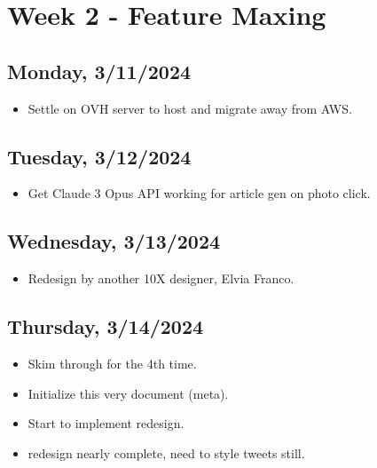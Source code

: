 \newpage
\section{Week 2 - Feature Maxing}

\subsection*{Monday, 3/11/2024}
\begin{itemize}
    \item Settle on OVH server to host and migrate away from AWS.
\end{itemize}

\subsection*{Tuesday, 3/12/2024}
\begin{itemize}
    \item Get Claude 3 Opus API working for article gen on photo click.
\end{itemize}

\subsection*{Wednesday, 3/13/2024}
\begin{itemize}
    \item Redesign by another 10X designer, Elvia Franco. 
\end{itemize}

\subsection*{Thursday, 3/14/2024}
\begin{itemize}
    \item Skim through \cite{huyen2022designing} for the 4th time.
    \item Initialize this very document (meta).
    \item Start to implement redesign.
    \item redesign nearly complete, need to style tweets still.
\end{itemize}
